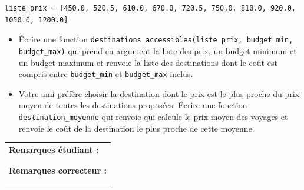 \documentclass[a4paper,11pt]{article}
\begin{document}
\begin{verbatim}
liste_prix = [450.0, 520.5, 610.0, 670.0, 720.5, 750.0, 810.0, 920.0, 1050.0, 1200.0]
\end{verbatim}


\begin{itemize}
\item[1.] Écrire une fonction \texttt{destinations\_accessibles(liste\_prix, budget\_min, budget\_max)} qui
 prend en argument la liste des prix, un budget minimum et un budget maximum 
et renvoie la liste des destinations dont le coût est compris entre \texttt{budget\_min} et \texttt{budget\_max} inclus.
\item[2.]  Votre ami préfère choisir la destination dont le prix est le plus proche du prix moyen de toutes les destinations proposées.
Écrire une fonction \texttt{destination\_moyenne} qui renvoie qui calcule le prix moyen des voyages et  renvoie le coût de la destination le plus proche de cette moyenne.
\end{itemize}


\begin{table}[h!]
\centering
\renewcommand{\arraystretch}{1.4} %
\begin{tabular}{|p{15cm}|}
\hline
\textbf{Remarques étudiant :}    \\
 \\
 \\
\hline
\textbf{Remarques correcteur :}  \\
 \\
 \\
\hline
\end{tabular}
\end{table}
\end{document}
